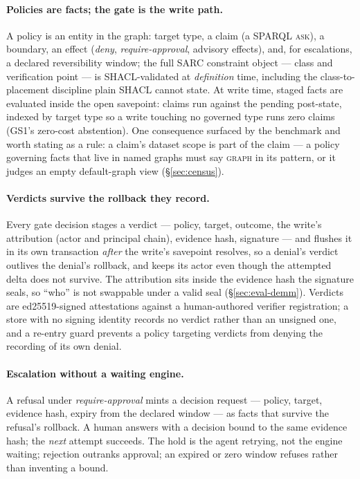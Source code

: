 \paragraph{Policies are facts; the gate is the write path.}
A policy is an entity in the graph: target type, a claim (a SPARQL
\textsc{ask}), a boundary, an effect (\emph{deny},
\emph{require-approval}, advisory effects), and, for escalations, a
declared reversibility window; the full SARC constraint object ---
class and verification point --- is SHACL-validated at \emph{definition}
time, including the class-to-placement discipline plain SHACL cannot
state. At write time, staged facts are evaluated inside the open
savepoint: claims run against the pending post-state, indexed by
target type so a write touching no governed type runs zero claims
(GS1's zero-cost abstention). One consequence surfaced by the
benchmark and worth stating as a rule: a claim's dataset scope is part
of the claim --- a policy governing facts that live in named graphs must
say \textsc{graph} in its pattern, or it judges an empty default-graph
view (\S\ref{sec:census}).

\paragraph{Verdicts survive the rollback they record.}
Every gate decision stages a verdict --- policy, target, outcome, the
write's attribution (actor and principal chain), evidence hash,
signature --- and flushes it in its own transaction \emph{after} the
write's savepoint resolves, so a denial's verdict outlives the
denial's rollback, and keeps its actor even though the attempted
delta does not survive. The attribution sits inside the evidence hash
the signature seals, so ``who'' is not swappable under a valid seal
(\S\ref{sec:eval-demm}). Verdicts are ed25519-signed attestations
against a human-authored verifier registration; a store with no
signing identity records no verdict rather than an unsigned one, and
a re-entry guard prevents a policy targeting verdicts from denying
the recording of its own denial.

\paragraph{Escalation without a waiting engine.}
A refusal under \emph{require-approval} mints a decision request ---
policy, target, evidence hash, expiry from the declared window --- as
facts that survive the refusal's rollback. A human answers with a
decision bound to the same evidence hash; the \emph{next} attempt
succeeds. The hold is the agent retrying, not the engine waiting;
rejection outranks approval; an expired or zero window refuses rather
than inventing a bound.

